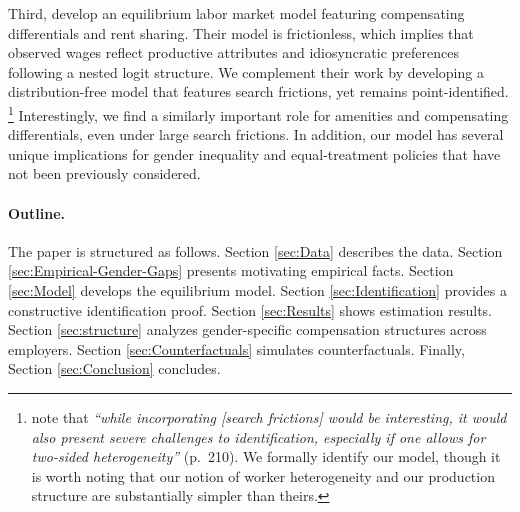 Third, \citet{LamadonMogstadSetzler2022} develop an equilibrium labor market model featuring compensating differentials and rent sharing. Their model is frictionless, which implies that observed wages reflect productive attributes and idiosyncratic preferences following a nested logit structure. We complement their work by developing a distribution-free model that features search frictions, yet remains point-identified.%
%
\footnote{\citet{LamadonMogstadSetzler2022} note that \emph{``while incorporating [search frictions] would be interesting, it would also present severe challenges to identification, especially if one allows for two-sided heterogeneity''} (p.\ 210). We formally identify our model, though it is worth noting that our notion of worker heterogeneity and our production structure are substantially simpler than theirs.} %
%
Interestingly, we find a similarly important role for amenities and compensating differentials, even under large search frictions. In addition, our model has several unique implications for gender inequality and equal-treatment policies that have not been previously considered.


\paragraph{Outline.}

The paper is structured as follows. %
Section \ref{sec:Data} describes the data. %
Section \ref{sec:Empirical-Gender-Gaps} presents motivating empirical facts. %
Section \ref{sec:Model} develops the equilibrium model. %
Section \ref{sec:Identification} provides a constructive identification proof. %
Section \ref{sec:Results} shows estimation results. %
Section \ref{sec:structure} analyzes gender-specific compensation structures across employers. %
Section \ref{sec:Counterfactuals} simulates counterfactuals. %
Finally, Section \ref{sec:Conclusion} concludes.
